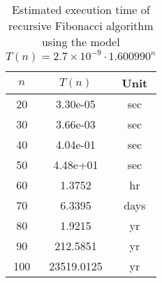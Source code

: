 
\begin{table}[h]
\centering
\caption{Estimated execution time of recursive Fibonacci algorithm using the model $T(n) = 2.7 \times 10^{-9} \cdot 1.600990^n$}
\begin{tabular}{|c|c|c|}
\hline
$n$ & $T(n)$ & Unit \\
\hline
20 & 3.30e-05 & sec \\ 
\hline
30 & 3.66e-03 & sec \\ 
\hline
40 & 4.04e-01 & sec \\ 
\hline
50 & 4.48e+01 & sec \\ 
\hline
60 & 1.3752 & hr \\ 
\hline
70 & 6.3395 & days \\ 
\hline
80 & 1.9215 & yr \\ 
\hline
90 & 212.5851 & yr \\ 
\hline
100 & 23519.0125 & yr \\ 
\hline

\end{tabular}
\end{table}
